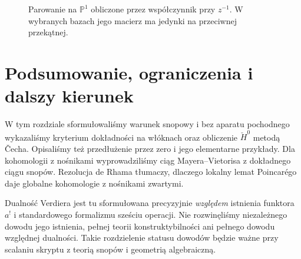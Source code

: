 \begin{figure}[!htbp]
\centering
{}
\caption{Parowanie na $\mathbb P^1$ obliczone
przez współczynnik przy $z^{-1}$.
W wybranych bazach jego macierz ma jedynki
na przeciwnej przekątnej.}
\label{fig:p1-serre-residue}
\end{figure}

\section{Podsumowanie, ograniczenia i dalszy kierunek}
W tym rozdziale sformułowaliśmy warunek snopowy
i bez aparatu pochodnego wykazaliśmy kryterium dokładności
na włóknach oraz obliczenie $\check H^0$ metodą \v{C}echa.
Opisaliśmy też przedłużenie przez zero i jego elementarne przykłady. Dla kohomologii z nośnikami
wyprowadziliśmy ciąg Mayera--Vietorisa z dokładnego
ciągu snopów. Rezolucja de Rhama tłumaczy,
dlaczego lokalny lemat Poincarégo daje globalne
kohomologie z nośnikami zwartymi.

Dualność Verdiera jest tu sformułowana precyzyjnie
\emph{względem} istnienia funktora $a^!$
i standardowego formalizmu sześciu operacji.
Nie rozwinęliśmy niezależnego dowodu jego istnienia,
pełnej teorii konstruktybilności ani
pełnego dowodu względnej dualności. Takie rozdzielenie
statusu dowodów będzie ważne przy scalaniu skryptu
z teorią snopów i geometrią algebraiczną.


